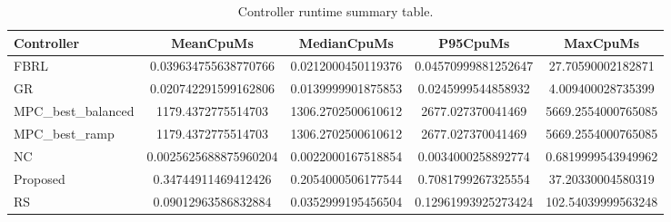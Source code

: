 \begin{table}[t]
\centering
\caption{Controller runtime summary table.}
\label{tab:runtime_auto}
\begin{tabular}{lcccc}
\toprule
Controller & MeanCpuMs & MedianCpuMs & P95CpuMs & MaxCpuMs \\
\midrule
FBRL & 0.039634755638770766 & 0.0212000450119376 & 0.04570999881252647 & 27.70590002182871 \\
GR & 0.020742291599162806 & 0.0139999901875853 & 0.0245999544858932 & 4.009400028735399 \\
MPC\_best\_balanced & 1179.4372775514703 & 1306.2702500610612 & 2677.027370041469 & 5669.2554000765085 \\
MPC\_best\_ramp & 1179.4372775514703 & 1306.2702500610612 & 2677.027370041469 & 5669.2554000765085 \\
NC & 0.0025625688875960204 & 0.0022000167518854 & 0.0034000258892774 & 0.6819999543949962 \\
Proposed & 0.34744911469412426 & 0.2054000506177544 & 0.7081799267325554 & 37.20330004580319 \\
RS & 0.09012963586832884 & 0.0352999195456504 & 0.12961993925273424 & 102.54039999563248 \\
\bottomrule
\end{tabular}
\end{table}